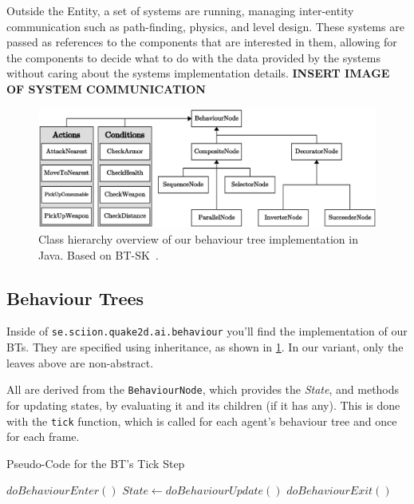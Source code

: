 \documentclass[a4paper, twocolumn]{article}
\begin{document}
        Outside the Entity, a set of systems are running, managing inter-entity communication such as path-finding, physics, and level design. These systems are passed as references to the components that are interested in them, allowing for the components to decide what to do with the data provided by the systems without caring about the systems implementation details. 
        \textbf{INSERT IMAGE OF SYSTEM COMMUNICATION}

        \clearpage

        \begin{figure}[H]
            \onecolumn
            \centering
            \includegraphics[width=\textwidth]{share/behaviour_tree_uml.eps}
            \caption{Class hierarchy overview of our behaviour tree implementation in Java. Based on BT-SK~\cite{champandard2014behaviour}.}
            \label{fig:behaviour_tree_hierarchy}
            \twocolumn
        \end{figure}

        \subsection{Behaviour Trees} \label{sec:behaviour_trees_implementation}

        Inside of \texttt{se.sciion.quake2d.ai.behaviour} you'll find the implementation of our BTs. They are specified using inheritance, as shown in \cref{fig:behaviour_tree_hierarchy}. In our variant, only the leaves above are non-abstract.

        All are derived from the \texttt{BehaviourNode}, which provides the \emph{State}, and methods for updating states, by evaluating it and its children (if it has any). This is done with the \texttt{tick} function, which is called for each agent's behaviour tree and once for each frame.

        \vspace{-0.4em}

        \begin{algorithm}
            \caption{Pseudo-Code for the BT's Tick Step}
            \label{alg:behaviour_tree_update}
            \begin{algorithmic}
                    \STATE \(doBehaviourEnter()\)
                \ENDIF
                \STATE \(State \leftarrow doBehaviourUpdate()\)
                    \STATE \(doBehaviourExit()\)
                \ENDIF
            \end{algorithmic}
        \end{algorithm}
\end{document}
